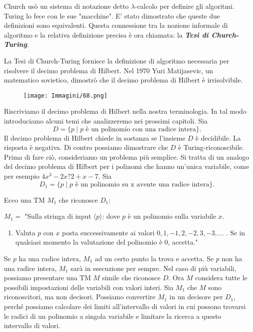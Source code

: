 \documentclass{article}
\begin{document}
Church usò un sistema di notazione detto $\lambda$-calcolo per definire gli algoritmi.
Turing lo fece con le sue "macchine".
E' stato dimostrato che queste due definizioni sono equivalenti.
Questa connessione tra la nozione informale di algoritmo e la relativa definizione precisa è ora chiamata: la \textbf{\textit{Tesi di Church-Turing}}.

La Tesi di Church-Turing fornisce la definizione di algoritmo necessaria per risolvere il decimo problema di Hilbert.
Nel 1970 Yuri Matijasevic, un matematico sovietico, dimostrò che il decimo problema di Hilbert è irrisolvibile.

\begin{figure}[H]
    \centering
    \texttt{[image: Immagini/68.png]}
    \label{fig:example_image}
\end{figure}

Riscriviamo il decimo problema di Hilbert nella nostra terminologia.
In tal modo introduciamo alcuni temi che analizzeremo nei prossimi capitoli. Sia
$$
D = \{p \mid p \text{ è un polinomio con una radice intera}\}.
$$
Il decimo problema di Hilbert chiede in sostanza se l'insieme $D$ è decidibile.
La risposta è negativa.
Di contro possiamo dimostrare che $D$ è Turing-riconoscibile.
Prima di fare ciò, consideriamo un problema più semplice.
Si tratta di un analogo del decimo problema di Hilbert per i polinomi che hanno un'unica variabile, come per esempio $4x^3 - 2x?2 + x - 7$.
Sia 
$$
D_1 = \{p \mid p \text{ è un polinomio su x avente una radice intera}\}.
$$

Ecco una TM $M_1$ che riconosce $D_1$:
\newline

$M_1 = $ "Sulla stringa di input $\langle p \rangle$: dove $p$ è un polinomio sulla variabile $x$.
\begin{enumerate}
    \item Valuta $p$ con $x$ posta successivamente ai valori $0,1,-1,2,-2,3,-3,...$ . Se in qualsiasi momento la valutazione del polinomio è 0, accetta."
\end{enumerate}

Se $p$ ha una radice intera, $M_1$ ad un certo punto la trova e accetta. 
Se $p$ non ha una radice intera, $M_1$ sarà in esecuzione per sempre. 
Nel caso di più variabili, possiamo presentare una TM $M$ simile che riconosce $D$. 
Ora $M$ considera tutte le possibili impostazioni delle variabili con valori interi.
Sia $M_1$ che $M$ sono riconoscitori, ma non decisori. 
Possiamo convertire $M_1$ in un decisore per $D_1$, perché possiamo calcolare dei limiti all'intervallo di valori in cui possono trovarsi le radici di un polinomio a singola variabile e limitare la ricerca a questo intervallo di valori. 
\end{document}
